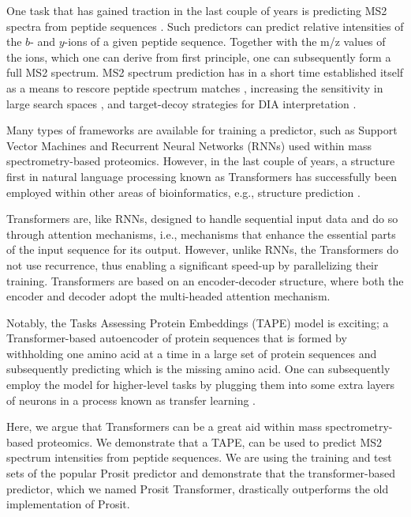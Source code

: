 \documentclass[10pt,a4paper]{article}
\begin{document}
One task that has gained traction in the last couple of years is predicting MS2 spectra from peptide sequences \cite{Degroeve2015-fh,Gessulat2019-el}. Such predictors can predict relative intensities of the $b$- and $y$-ions of a given peptide sequence. Together with the m/z values of the ions, which one can derive from first principle, one can subsequently form a full MS2 spectrum. MS2 spectrum prediction has in a short time established itself as a means to rescore peptide spectrum matches \cite{C_Silva2019-ja}, increasing the sensitivity in large search spaces \cite{Wilhelm2021-mz}, and target-decoy strategies for DIA interpretation \cite{Searle2020-yk}.

Many types of frameworks are available for training a predictor, such as Support Vector Machines and Recurrent Neural Networks (RNNs) used within mass spectrometry-based proteomics. However, in the last couple of years, a structure first in natural language processing \cite{devlin2018bert} known as Transformers \cite{Vaswani2017-sy} has successfully been employed within other areas of bioinformatics, e.g., structure prediction \cite{Rao2019-qq,Bepler2021-ci}.

Transformers are, like RNNs, designed to handle sequential input data and do so through attention mechanisms, i.e., mechanisms that enhance the essential parts of the input sequence for its output. However, unlike RNNs, the Transformers do not use recurrence, thus enabling a significant speed-up by parallelizing their training. Transformers are based on an encoder-decoder structure, where both the encoder and decoder adopt the multi-headed attention mechanism\cite{Vaswani2017-sy}.

Notably, the Tasks Assessing Protein Embeddings (TAPE) model \cite{Rao2019-qq} is exciting; a Transformer-based autoencoder of protein sequences that is formed by withholding one amino acid at a time in a large set of protein sequences and subsequently predicting which is the missing amino acid. One can subsequently employ the model for higher-level tasks by plugging them into some extra layers of neurons in a process known as transfer learning \cite{Rao2019-qq,Bepler2021-ci}.

Here, we argue that Transformers can be a great aid within mass spectrometry-based proteomics. We demonstrate that a TAPE, can be used to predict MS2 spectrum intensities from peptide sequences. We are using the training and test sets of the popular Prosit \cite{Gessulat2019-el} predictor and demonstrate that the transformer-based predictor, which we named Prosit Transformer, drastically outperforms the old implementation of Prosit.
\end{document}
